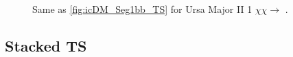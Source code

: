 \begin{figure}[ht]
    \caption{Same as \cref{fig:icDM_Seg1bb_TS} for Ursa Major II 1 $\chi\chi \rightarrow$ \parpar{\nu_\mu}.}
    \label{fig:icDM_UMa2numu_TS}
\end{figure}


\subsection{Stacked TS} \label{sec:icDM_TSstacked}


